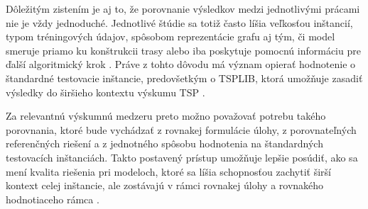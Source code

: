 Dôležitým zistením je aj to, že porovnanie výsledkov medzi jednotlivými prácami
nie je vždy jednoduché. Jednotlivé štúdie sa totiž často líšia veľkosťou
inštancií, typom tréningových údajov, spôsobom reprezentácie grafu aj tým,
či model smeruje priamo ku konštrukcii trasy alebo iba poskytuje pomocnú
informáciu pre ďalší algoritmický krok
\parencite{joshi2022generalization,bengio2021mlco}. Práve z tohto dôvodu má
význam opierať hodnotenie o štandardné testovacie inštancie, predovšetkým o TSPLIB,
ktorá umožňuje zasadiť výsledky do širšieho kontextu výskumu TSP
\parencite{reinelt1991tsplib}.

Za relevantnú výskumnú medzeru preto možno považovať potrebu takého porovnania,
ktoré bude vychádzať z rovnakej formulácie úlohy, z porovnateľných referenčných
riešení a z jednotného spôsobu hodnotenia na štandardných testovacích inštanciách.
Takto postavený prístup umožňuje lepšie posúdiť, ako sa mení kvalita riešenia
pri modeloch, ktoré sa líšia schopnosťou zachytiť širší kontext celej inštancie,
ale zostávajú v rámci rovnakej úlohy a rovnakého hodnotiaceho rámca
\parencite{joshi2022generalization,reinelt1991tsplib,hudson2022gls,
xin2021neurolkh}.
